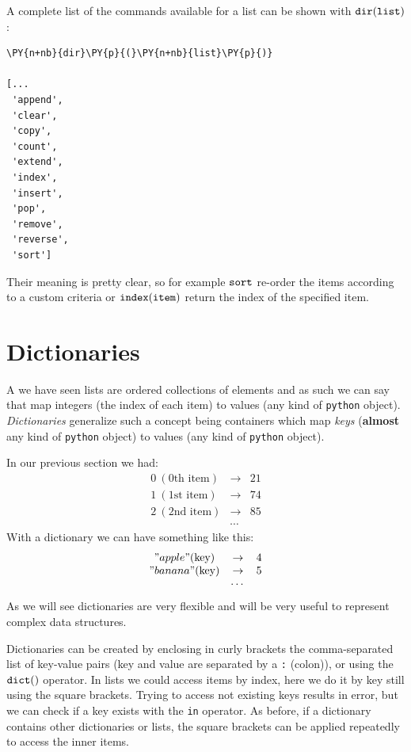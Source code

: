 A complete list of the commands available for a list can be shown with $\tt{dir(list)}$:

\begin{codebox}[breakable, size=fbox, boxrule=1pt, pad at break*=1mm,colback=cellbackground, colframe=cellborder]
\begin{Verbatim}[commandchars=\\\{\}]
\PY{n+nb}{dir}\PY{p}{(}\PY{n+nb}{list}\PY{p}{)}

[...
 'append',
 'clear',
 'copy',
 'count',
 'extend',
 'index',
 'insert',
 'pop',
 'remove',
 'reverse',
 'sort']
\end{Verbatim}
\end{codebox}

Their meaning is pretty clear, so for example $\tt{sort}$ re-order the items according to a custom criteria or $\tt{index(item)}$ return the index of the specified item.

\section{Dictionaries}\label{dictionaries}

A we have seen lists are ordered collections of elements and as such we can say that map integers 
(the index of each item) to values (any kind of \texttt{python} object). 
\emph{Dictionaries} generalize such a concept being containers which map \emph{keys} 
(\textbf{almost} any kind of \texttt{python} object) to values (any kind of \texttt{python} object).

In our previous section we had:
\[
\begin{matrix} 
0~(\textrm{0th item})& \rightarrow& 21\\
1~(\textrm{1st item})& \rightarrow& 74\\
2~(\textrm{2nd item})& \rightarrow& 85\\ 
&\cdots&  
\end{matrix}
\]
With a dictionary we can have something like this:
\[
\begin{matrix}
"apple" (\textrm{key})&\rightarrow& 4 \\
"banana" (\textrm{key})& \rightarrow& 5 \\
&\cdots&
\end{matrix}
\]
As we will see dictionaries are very flexible and will be very useful to represent complex data structures.

Dictionaries can be created by enclosing in curly brackets the comma-separated list of key-value pairs 
(key and value are separated by a \texttt{:} (colon)), or using the $\tt{dict()}$ operator.
In lists we could access items by index, here we do it by key still using the square brackets. 
Trying to access not existing keys results in error, but we can check if a key exists with the 
\texttt{in} operator.
As before, if a dictionary contains other dictionaries or lists, the square brackets can be applied 
repeatedly to access the inner items.

